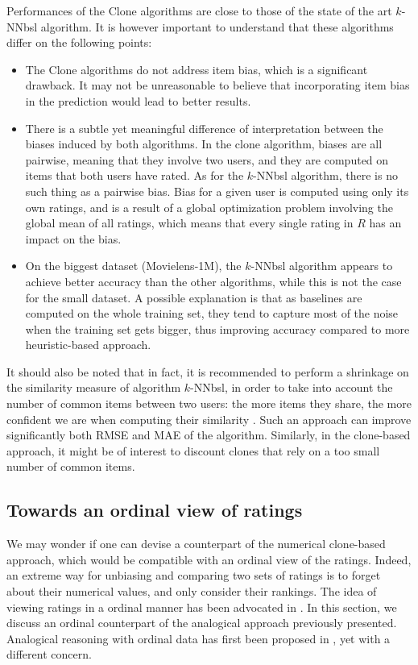 Performances of the Clone algorithms are close to those of the state of the
art $k$-NNbsl algorithm. It is however important to understand that these
algorithms differ on the following points:
\begin{itemize}
\item The Clone algorithms do not address item bias, which is a significant
  drawback. It may not be unreasonable to believe that incorporating item bias
  in the prediction would lead to better results.
\item There is a subtle yet meaningful difference of interpretation between the
  biases induced by both algorithms. In the clone algorithm, biases are all
  pairwise, meaning that they involve two users, and they are computed on items
  that both users have rated. As for the $k$-NNbsl algorithm, there is no such
  thing as a pairwise bias. Bias for a given user is computed using only its
  own ratings, and is a result of a global optimization problem involving the
  global mean of all ratings, which means that every single rating in $R$ has
  an impact on the bias.
\item On the biggest dataset (Movielens-1M), the $k$-NNbsl algorithm appears to
  achieve better accuracy than the other algorithms, while this is not the case
  for the small dataset. A possible explanation is that as baselines are
  computed on the whole training set, they tend to capture most of the noise
  when the training set gets bigger, thus improving accuracy compared to more
  heuristic-based approach.
\end{itemize}

It should also be noted that in fact, it is recommended to perform a shrinkage
on the similarity measure of algorithm $k$-NNbsl, in order to take into account
the number of common items between two users: the more items they share, the
more confident we are when computing their similarity \cite{KorACM2010}. Such
an approach can improve significantly both RMSE and MAE of the algorithm.
Similarly, in the clone-based approach, it might be of interest to discount
clones that rely on a too small number of common items.

\subsection{Towards an ordinal view of ratings}
\label{ORDINAL_POV}

We may wonder if one can devise a counterpart of the numerical clone-based
approach, which would be compatible with an ordinal view of the ratings.
Indeed, an extreme way for unbiasing and comparing two sets of ratings is to
forget about their numerical values, and only consider their rankings.  The
idea of viewing ratings in a ordinal manner has been advocated in
\cite{KorSillRECSYS11}.
In this section, we discuss an ordinal counterpart of the analogical approach
previously presented.  Analogical reasoning with ordinal data has first been
proposed in \cite{MicBarCAP09}, yet with a different concern.

